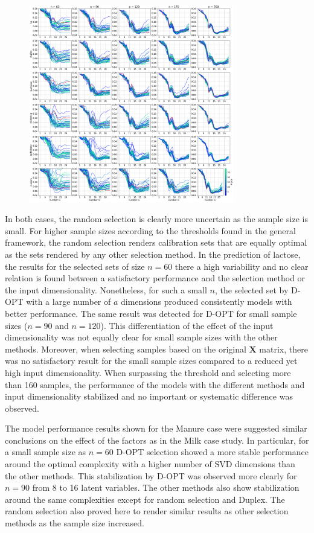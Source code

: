 \documentclass{article}
\begin{document}
\begin{figure}[b]
\includegraphics[width=0.8\textwidth]{manuscript/figures/d01_milk_model_performance.png}
\centering
\caption{}
\label{fig_d01_milk_model_performance}
\end{figure}

In both cases, the random selection is clearly more uncertain as the sample size is small. For higher sample sizes according to the thresholds found in the general framework, the random selection renders calibration sets that are equally optimal as the sets rendered by any other selection method. In the prediction of lactose, the results for the selected sets of size $n=60$ there a high variability and no clear relation is found between a satisfactory performance and the selection method or the input dimensionality. Nonetheless, for such a small $n$, the selected set by D-OPT with a large number of $a$ dimensions produced consistently models with better performance. The same result was detected for D-OPT for small sample sizes ($n=90$ and $n=120$). This differentiation of the effect of the input dimensionality was not equally clear for small sample sizes with the other methods. Moreover, when selecting samples based on the original $\mathbf{X}$ matrix, there was no satisfactory result for the small sample sizes compared to a reduced yet high input dimensionality. When surpassing the threshold and selecting more than 160 samples, the performance of the models with the different methods and input dimensionality stabilized and no important or systematic difference was observed.

The model performance results shown for the Manure case were suggested similar conclusions on the effect of the factors as in the Milk case study. In particular, for a small sample size as $n=60$ D-OPT selection showed a more stable performance  around the optimal complexity with a higher number of SVD dimensions than the other methods. This stabilization by D-OPT was observed more clearly for $n=90$ from 8 to 16 latent variables. The other methods also show stabilization around the same complexities except for random selection and Duplex. The random selection also proved here to render similar results as other selection methods as the sample size increased.
\end{document}
